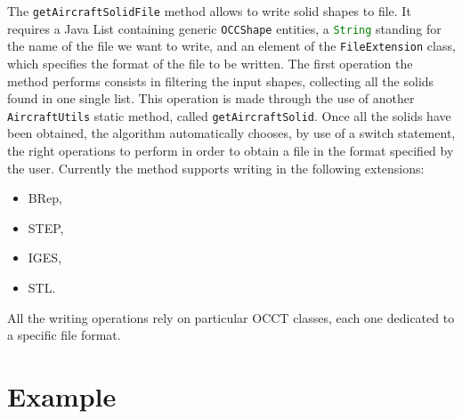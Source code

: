 The \lstinline[language=Java]!getAircraftSolidFile! method allows to write solid shapes to file. It requires a Java \gls{List} containing generic \lstinline[language=Java]!OCCShape! entities, a \lstinline[language=Java]!String! standing for the name of the file we want to write, and an element of the \lstinline[language=Java]!FileExtension! class, which specifies the format of the file to be written. The first operation the method performs consists in filtering the input shapes, collecting all the solids found in one single list. This operation is made through the use of another \lstinline[language=Java]!AircraftUtils! static method, called \lstinline[language=Java]!getAircraftSolid!. Once all the solids have been obtained, the algorithm automatically chooses, by use of a switch statement, the right operations to perform in order to obtain a file in the format specified by the user. Currently the method supports writing in the following extensions:
%
\begin{itemize}
\item \gls{BRep},
\item STEP,
\item IGES,
\item STL.
\end{itemize}
%
All the writing operations rely on particular \gls{OCCT} classes, each one dedicated to a specific file format.

\section{Example}
\label{sec3.6}

